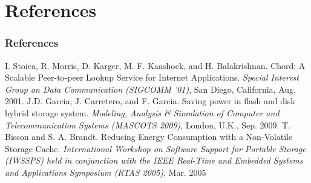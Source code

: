 \documentclass{beamer}
\begin{document}
\section{References}
\begin{frame}
	\frametitle{References}
	\footnotesize {
		\begin{thebibliography}{98}
			 I. Stoica, R. Morris, D. Karger, M. F. Kaashoek, and H. Balakrishnan.
			Chord: A Scalable Peer-to-peer Lookup Service for Internet Applications.
			\emph{Special Interest Group on Data Communication (SIGCOMM '01)},
			San Diego, California, Aug. 2001.
			 J.D. Garcia, J. Carretero, and F. Garcia.
			Saving power in flash and disk hybrid storage system.
			\emph{Modeling, Analysis \& Simulation of Computer and Telecommunication Systems
				(MASCOTS 2009)}, London, U.K., Sep. 2009.
			 T. Bisson and S. A. Brandt.
			Reducing Energy Consumption with a Non-Volatile Storage Cache.
			\emph{International Workshop on Software Support for Portable Storage (IWSSPS)
				held in conjunction with the IEEE Real-Time and Embedded Systems and Applications
				Symposium (RTAS 2005)}, Mar. 2005
		\end{thebibliography}
	}
\end{frame}
%
\end{document}
